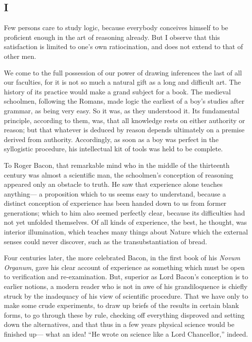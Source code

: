 \documentclass[]{article}
\begin{document}
\subsection*{I}


Few persons care to study logic, because everybody conceives himself to be proficient enough in the art of reasoning already. But I observe that this satisfaction is limited to one's own ratiocination, and does not extend to that of other men.

We come to the full possession of our power of drawing inferences the last of all our faculties, for it is not so much a natural gift as a long and difficult art. The history of its practice would make a grand subject for a book. The medieval schoolmen, following the Romans, made logic the earliest of a boy's studies after grammar, as being very easy. So it was, as they understood it. Its fundamental principle, according to them, was, that all knowledge rests on either authority or reason; but that whatever is deduced by reason depends ultimately on a premise derived from authority. Accordingly, as soon as a boy was perfect in the syllogistic procedure, his intellectual kit of tools was held to be complete.

To Roger Bacon, that remarkable mind who in the middle of the thirteenth century was almost a scientific man, the schoolmen's conception of reasoning appeared only an obstacle to truth. He saw that experience alone teaches anything--- a proposition which to us seems easy to understand, because a distinct conception of experience has been handed down to us from former generations; which to him also seemed perfectly clear, because its difficulties had not yet unfolded themselves. Of all kinds of experience, the best, he thought, was interior illumination, which teaches many things about Nature which the external senses could never discover, such as the transubstantiation of bread.

Four centuries later, the more celebrated Bacon, in the first book of his \emph{Novum Organum}, gave his clear account of experience as something which must be open to verification and re-examination. But, superior as Lord Bacon's conception is to earlier notions, a modern reader who is not in awe of his grandiloquence is chiefly struck by the inadequacy of his view of scientific procedure. That we have only to make some crude experiments, to draw up briefs of the results in certain blank forms, to go through these by rule, checking off everything disproved and setting down the alternatives, and that thus in a few years physical science would be finished up--- what an idea! ``He wrote on science like a Lord Chancellor,'' indeed. 
\end{document}
